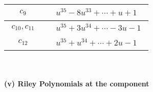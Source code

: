 \documentclass[1p]{elsarticle_modified}
\theoremstyle{definition}
\begin{document}
\begin{tabular}{m{50pt}|m{274pt}}
\hline $$\begin{aligned}c_{9}\end{aligned}$$&$\begin{aligned}
&u^{35}-8 u^{33}+\cdots+u+1
\end{aligned}$\\
\hline $$\begin{aligned}c_{10},c_{11}\end{aligned}$$&$\begin{aligned}
&u^{35}+3 u^{34}+\cdots-3 u-1
\end{aligned}$\\
\hline $$\begin{aligned}c_{12}\end{aligned}$$&$\begin{aligned}
&u^{35}+u^{34}+\cdots+2 u-1
\end{aligned}$\\
\hline
\end{tabular}\\~\\
\newpage\renewcommand{\arraystretch}{1}
\flushleft \textbf{(v) Riley Polynomials at the component}\newline \\
\end{document}
